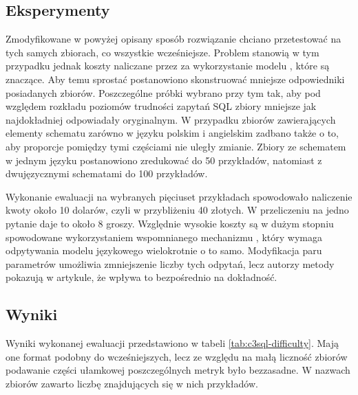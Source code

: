 \subsection{Eksperymenty}
Zmodyfikowane w powyżej opisany sposób rozwiązanie  chciano przetestować na tych samych zbiorach, co wszystkie wcześniejsze. Problem stanowią w tym przypadku jednak koszty naliczane przez  za wykorzystanie modelu , które są znaczące. Aby temu sprostać postanowiono skonstruować mniejsze odpowiedniki posiadanych zbiorów. Poszczególne próbki wybrano przy tym tak, aby pod względem rozkładu poziomów trudności zapytań SQL zbiory mniejsze jak najdokładniej odpowiadały oryginalnym. W przypadku zbiorów zawierających elementy schematu zarówno w języku polskim i angielskim zadbano także o to, aby proporcje pomiędzy tymi częściami nie uległy zmianie. Zbiory ze schematem w jednym języku postanowiono zredukować do 50 przykładów, natomiast z dwujęzycznymi schematami do 100 przykładów. 

Wykonanie ewaluacji na wybranych pięciuset przykładach spowodowało naliczenie kwoty około 10 dolarów, czyli w przybliżeniu 40 złotych. W przeliczeniu na jedno pytanie daje to około 8 groszy. Względnie wysokie koszty są w dużym stopniu spowodowane wykorzystaniem wspomnianego mechanizmu , który wymaga odpytywania modelu językowego wielokrotnie o to samo. Modyfikacja paru parametrów umożliwia zmniejszenie liczby tych odpytań, lecz autorzy metody pokazują w artykule, że wpływa to bezpośrednio na dokładność.

\subsection{Wyniki}
Wyniki wykonanej ewaluacji przedstawiono w tabeli \ref{tab:c3sql-difficulty}. Mają one format podobny do wcześniejszych, lecz ze względu na małą liczność zbiorów podawanie części ułamkowej poszczególnych metryk było bezzasadne. W nazwach zbiorów zawarto liczbę znajdujących się w nich przykładów.

